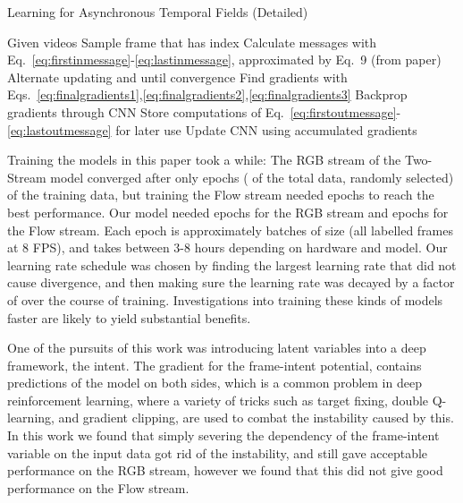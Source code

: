 \documentclass[10pt,twocolumn,letterpaper]{article}
\begin{document}
\begin{algorithm}
  \caption{Learning for Asynchronous Temporal Fields (Detailed)}
  \begin{algorithmic}[1]
      \State Given videos  
      \While{}
          \State Sample frame  that has index 
          \State Calculate messages with Eq.~\ref{eq:firstinmessage}-\ref{eq:lastinmessage}, approximated by Eq.~9 (from paper)
          \State Alternate updating  and  until convergence
          \State Find gradients with Eqs.~\ref{eq:finalgradients1},\ref{eq:finalgradients2},\ref{eq:finalgradients3}
          \State Backprop gradients through CNN
          \State Store computations of Eq.~\ref{eq:firstoutmessage}-\ref{eq:lastoutmessage} for later use
        \EndFor
        \State Update CNN using accumulated gradients
      \EndWhile
  \end{algorithmic}
  \label{alg:full}
\end{algorithm}

 Training the models in this paper took a while: The RGB stream of the Two-Stream model converged after only  epochs ( of the total data, randomly selected) of the training data, but training the Flow stream needed  epochs to reach the best performance. Our model needed  epochs for the RGB stream and  epochs for the Flow stream. Each  epoch is approximately  batches of size  (all labelled frames at 8 FPS), and takes between 3-8 hours depending on hardware and model. Our learning rate schedule was chosen by finding the largest learning rate that did not cause divergence, and then making sure the learning rate was decayed by a factor of  over the course of training. Investigations into training these kinds of models faster are likely to yield substantial benefits.

 One of the pursuits of this work was introducing latent variables into a deep framework, the intent. The gradient for the frame-intent potential, contains predictions of the model on both sides, which is a common problem in deep reinforcement learning, where a variety of tricks such as target fixing, double Q-learning, and gradient clipping, are used to combat the instability caused by this. In this work we found that simply severing the dependency of the frame-intent variable on the input data got rid of the instability, and still gave acceptable performance on the RGB stream, however we found that this did not give good performance on the Flow stream.
\end{document}
